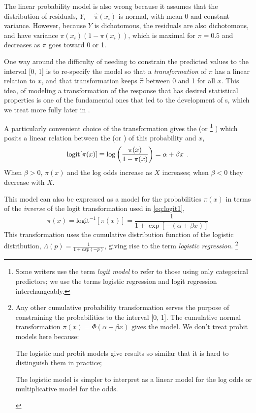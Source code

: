 \documentclass[11pt]{book}\usepackage[]{graphicx}\usepackage[]{color}
\begin{document}
The linear probability model is also wrong because it assumes that the distribution
of residuals, $Y_i - \hat{\pi} (x_i)$ is normal, with mean 0 and constant variance.
However, because $Y$ is dichotomous, the residuals are also dichotomous, and have
variance $\pi (x_i) (1 - \pi (x_i))$, which is maximal for $\pi = 0.5$ and decreases
as $\pi$ goes toward 0 or 1.

One way around the difficulty of needing to constrain the predicted values to
the interval [0, 1]
is to re-specify the model so that a
\emph{transformation} of $\pi$ has a linear relation to $x$, and that transformation
keeps $\hat{\pi}$ between 0 and 1 for all $x$. This idea, of modeling a
transformation of the response that has desired statistical properties is one of
the fundamental ones that led to the development of s,
which we treat more fully later in .

A particularly convenient choice of the transformation
gives the 
(or %
\footnote{
Some writers use the term \emph{logit model} to refer to those using only
categorical predictors; we use the terms logistic regression and
logit regression interchangeably.
}
)
which posits a linear relation between
the  (or ) of this probability and $x$,
\begin{equation}\label{eq:logit1}
\logit[ \pi(x) ] \equiv
\log \left( \frac{\pi(x) }{1-\pi(x) } \right) =
\alpha + \beta x \period
\end{equation}
When $\beta > 0$, $\pi (x)$ and the log odds increase as $X$ increases;
when $\beta < 0$ they decrease with $X$.

This model can also be expressed as a model for the probabilities $\pi (x)$
in terms of the \emph{inverse} of the logit transformation used in \eqref{eq:logit1},
\begin{equation}\label{eq:logit1a}
\pi (x) =
\mbox{logit}^{-1}[ \pi(x) ] =
\frac{1}{1 + \exp [- (\alpha + \beta x) ]}
\end{equation}
This transformation uses the cumulative distribution function of
the logistic distribution, $\Lambda (p) = \frac{1}{1+exp(-p)}$,
giving rise to the term \emph{logistic regression}.%
\footnote{
Any other cumulative probability transformation serves the purpose of 
constraining the probabilities to the interval [0, 1].
The cumulative normal transformation $\pi (x) = \Phi (\alpha + \beta x)$
gives the  model.
We don't treat probit models here because:
\begin{seriate}
 \item The logistic and probit models give results so similar that it is
 hard to distinguish them in practice;
 \item The logistic model is simpler to interpret as a linear model for
 the log odds or multiplicative model for the odds.
\end{seriate}
}
\end{document}

